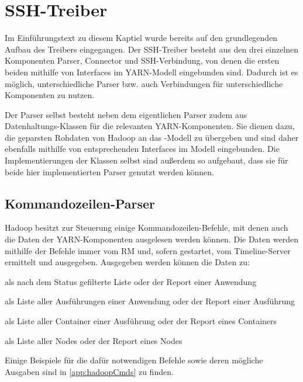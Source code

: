 \section{SSH-Treiber}\label{sec:sshDriver}

Im Einführungstext zu diesem Kaptiel wurde bereits auf den grundlegenden Aufbau des Treibers eingegangen. Der SSH-Treiber besteht aus den drei einzelnen Komponenten Parser, Connector und SSH-Verbindung, von denen die ersten beiden mithilfe von Interfaces im YARN-Modell eingebunden sind. Dadurch ist es möglich, unterschiedliche Parser bzw. auch Verbindungen für unterschiedliche Komponenten zu nutzen.

Der Parser selbst besteht neben dem eigentlichen Parser zudem aus Datenhaltungs-Klassen für die relevanten YARN-Komponenten. Sie dienen dazu, die geparsten Rohdaten von Hadoop an das \sS-Modell zu übergeben und sind daher ebenfalls mithilfe von entsprechenden Interfaces im Modell eingebunden. Die Implementierungen der Klassen selbst sind außerdem so aufgebaut, dass sie für beide hier implementierten Parser genutzt werden können.

\subsection{Kommandozeilen-Parser}\label{sec:cmdParser}

Hadoop besitzt zur Steuerung einige Kommandozeilen-Befehle, mit denen \uA auch die Daten der YARN-Komponenten ausgelesen werden können. Die Daten werden mithilfe der Befehle immer vom \ac{RM} und, sofern gestartet, vom Timeline-Server ermittelt und ausgegeben. Ausgegeben werden können \uA die Daten zu:

\begin{description}[noitemsep]
    \item[Anwendungen] als nach dem Status gefilterte Liste oder der Report einer Anwendung
    \item[Ausführungen] als Liste aller Ausführungen einer Anwendung oder der Report einer Ausführung
    \item[Container] als Liste aller Container einer Ausführung oder der Report eines Containers
    \item[Nodes] als Liste aller Nodes oder der Report eines Nodes
\end{description}

Einige Beispiele für die dafür notwendigen Befehle sowie deren mögliche Ausgaben sind in \autoref{app:hadoopCmds} zu finden.

